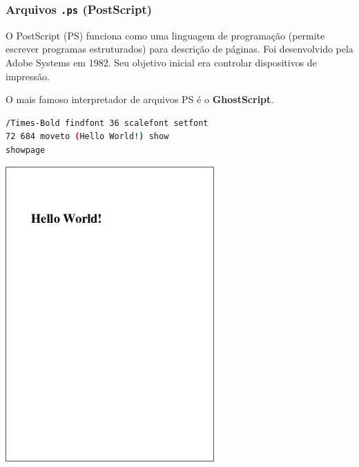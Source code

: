 \begin{frame}[fragile]
\frametitle{Arquivos \texttt{.ps} (PostScript)}
O PostScript (PS) funciona como uma linguagem de programação (permite escrever programas estruturados)
para descrição de páginas. Foi desenvolvido pela Adobe Systems em 1982. Seu objetivo inicial era 
controlar dispositivos de impressão.

\vspace{3ex}
\begin{minipage}[t]{0.65\textwidth}
O mais famoso interpretador de arquivos PS é o \textbf{GhostScript}.
\begin{lstlisting}[language=bash, label=lst-ps, caption={Exemplo `Hello World!'.}, postbreak=\mbox{$\hookrightarrow$\space}, basicstyle=\fontsize{8}{10}\selectfont\ttfamily]
%!PS
/Times-Bold findfont 36 scalefont setfont
72 684 moveto (Hello World!) show
showpage
\end{lstlisting}
\end{minipage}
\hspace{0.02\linewidth}
\begin{minipage}[t]{0.25\textwidth}
\centering
\strut\vspace*{-\baselineskip}\newline\includegraphics[width=0.6\textwidth,height=0.6\textheight,keepaspectratio]{figures/pshello.png}
\end{minipage}

\end{frame}

